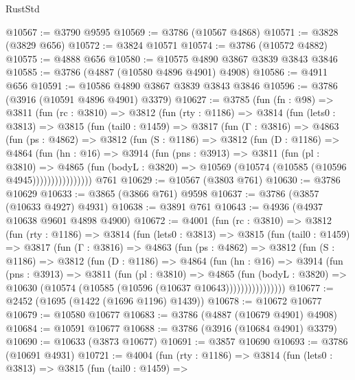 \begin{lexlean}{RustStd}
\begin{coremodule}
@10567 := @3790 @9595
@10569 := @3786 (@10567 @4868)
@10571 := @3828 (@3829 @656)
@10572 := @3824 @10571
@10574 := @3786 (@10572 @4882)
@10575 := @4888 @656
@10580 := @10575 @4890 @3867 @3839 @3843 @3846
@10585 := @3786 (@4887 (@10580 @4896 @4901) @4908)
@10586 := @4911 @656
@10591 := @10586 @4890 @3867 @3839 @3843 @3846
@10596 := @3786 (@3916 (@10591 @4896 @4901) @3379)
@10627 := @3785
    (fun (fn : @98) =>
    @3811
      (fun (rc : @3810) =>
      @3812
        (fun (rty : @1186) =>
        @3814
          (fun (lets0 : @3813) =>
          @3815
            (fun (tail0 : @1459) =>
            @3817
              (fun (Γ : @3816) =>
              @4863
                (fun (ps : @4862) =>
                @3812
                  (fun (S : @1186) =>
                  @3812
                    (fun (D : @1186) =>
                    @4864
                      (fun (hn : @16) =>
                      @3914
                        (fun (pns : @3913) =>
                        @3811
                          (fun (pl : @3810) =>
                          @4865
                            (fun (bodyL : @3820) =>
                            @10569 (@10574 (@10585 (@10596 @4945))))))))))))))))
    @761
@10629 := @10567 (@3803 @761)
@10630 := @3786 @10629
@10633 := @3865 (@3866 @761) @9598
@10637 := @3786 (@3857 (@10633 @4927) @4931)
@10638 := @3891 @761
@10643 := @4936 (@4937 @10638 @9601 @4898 @4900)
@10672 := @4001
    (fun (rc : @3810) =>
    @3812
      (fun (rty : @1186) =>
      @3814
        (fun (lets0 : @3813) =>
        @3815
          (fun (tail0 : @1459) =>
          @3817
            (fun (Γ : @3816) =>
            @4863
              (fun (ps : @4862) =>
              @3812
                (fun (S : @1186) =>
                @3812
                  (fun (D : @1186) =>
                  @4864
                    (fun (hn : @16) =>
                    @3914
                      (fun (pns : @3913) =>
                      @3811
                        (fun (pl : @3810) =>
                        @4865
                          (fun (bodyL : @3820) =>
                          @10630 (@10574 (@10585 (@10596 (@10637 @10643))))))))))))))))
@10677 := @2452 (@1695 (@1422 (@1696 @1196) @1439))
@10678 := @10672 @10677
@10679 := @10580 @10677
@10683 := @3786 (@4887 (@10679 @4901) @4908)
@10684 := @10591 @10677
@10688 := @3786 (@3916 (@10684 @4901) @3379)
@10690 := @10633 (@3873 @10677)
@10691 := @3857 @10690
@10693 := @3786 (@10691 @4931)
@10721 := @4004
    (fun (rty : @1186) =>
    @3814
      (fun (lets0 : @3813) =>
      @3815
        (fun (tail0 : @1459) =>

\end{coremodule}
\end{lexlean}
